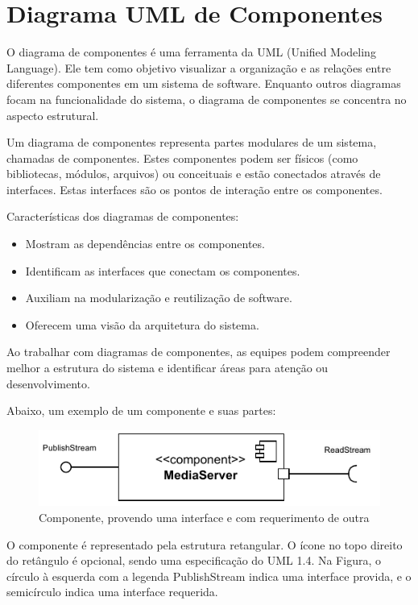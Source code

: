 \documentclass[12pt, %
openright, 
oneside, %
a4paper,    %
brazil]{facom-ufu-abntex2}
\begin{document}
\section{Diagrama UML de Componentes}

O diagrama de componentes é uma ferramenta da UML (Unified Modeling Language).
Ele tem como objetivo visualizar a organização e as relações entre diferentes
componentes em um sistema de software. Enquanto outros diagramas focam na
funcionalidade do sistema, o diagrama de componentes se concentra no aspecto
estrutural.

Um diagrama de componentes representa partes modulares de um sistema, chamadas
de componentes. Estes componentes podem ser físicos (como bibliotecas, módulos,
arquivos) ou conceituais e estão conectados através de interfaces. Estas
interfaces são os pontos de interação entre os componentes.

Características dos diagramas de componentes:
\begin{itemize}
	\item Mostram as dependências entre os componentes.
	\item Identificam as interfaces que conectam os componentes.
	\item Auxiliam na modularização e reutilização de software.
	\item Oferecem uma visão da arquitetura do sistema.
\end{itemize}

Ao trabalhar com diagramas de componentes, as equipes podem compreender melhor
a estrutura do sistema e identificar áreas para atenção ou desenvolvimento.

Abaixo, um exemplo de um componente e suas partes:

\begin{figure}[!ht]
	\centering
	\includegraphics[width=0.8\linewidth]{example_diagram.pdf}
	\caption[Componente de exemplo]{Componente, provendo uma interface e com requerimento de outra}
	\label{fig:graficosVariandoTamanhoRede}
\end{figure}

O componente é representado pela estrutura retangular. O ícone no topo direito
do retângulo é opcional, sendo uma especificação do UML 1.4. Na Figura, o
círculo à esquerda com a legenda PublishStream indica uma interface provida, e
o semicírculo indica uma interface requerida.
\end{document}
